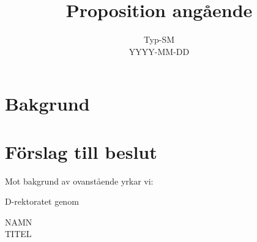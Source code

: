 \documentclass[a4paper]{article}
\title{Proposition angående }
\date{Typ-SM \\ YYYY-MM-DD} %
\begin{document}
\maketitle

\pagestyle{empty}
\thispagestyle{empty}

\section*{Bakgrund}


\section*{Förslag till beslut}
Mot bakgrund av ovanstående yrkar vi: %

\begin{list}{\bf att}{}
\item %
\end{list}


\vspace{2cm}
\noindent D-rektoratet genom %

\vspace{2cm}
\noindent NAMN \\ TITEL %
\end{document}
